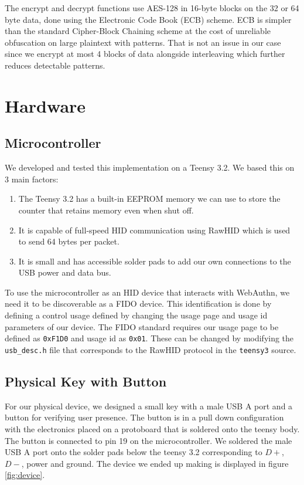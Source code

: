 \documentclass[acmtog,review]{acmart}
\begin{document}
The encrypt and decrypt functions use AES-128 in 16-byte blocks on the 32 or 64 byte data, done using the Electronic Code Book (ECB) scheme. ECB is simpler than the standard Cipher-Block Chaining scheme at the cost of unreliable obfuscation on large plaintext with patterns. That is not an issue in our case since we encrypt at most 4 blocks of data alongside interleaving which further reduces detectable patterns.

\section{Hardware}

\subsection{Microcontroller}
\label{Microcontroller}

We developed and tested this implementation on a Teensy 3.2. We 
based this on 3 main factors:

\begin{enumerate}
    \item The Teensy 3.2 has a built-in EEPROM memory we can use to store the counter that
    retains memory even when shut off.
    \item It is capable of full-speed HID communication using RawHID which is used to send 64 bytes 
    per packet.
    \item It is small and has accessible solder pads to add our own connections to the USB
    power and data bus.
\end{enumerate}

To use the microcontroller as an HID device that interacts with WebAuthn, we need it
to be discoverable as a FIDO device. This identification is done by defining a
control usage defined by changing the usage page and usage id parameters of
our device. The FIDO standard requires our usage page to be defined as \texttt{0xF1D0}
and usage id as \texttt{0x01}. These can be changed by modifying the \texttt{usb\_desc.h}
file that corresponds to the RawHID protocol in the \texttt{teensy3} source.

\subsection{Physical Key with Button}

For our physical device, we designed a small key with a male USB A port and a button for verifying 
user presence. The button is in a pull down configuration with the electronics placed on a 
protoboard that is soldered onto the teensy body. 
The button is connected to pin 19 on the microcontroller.
We soldered the male USB A port
onto the solder pads below the teensy 3.2 corresponding to $D+$, $D-$, power and ground.
The device we ended up making is displayed in figure \ref{fig:device}.
\end{document}
